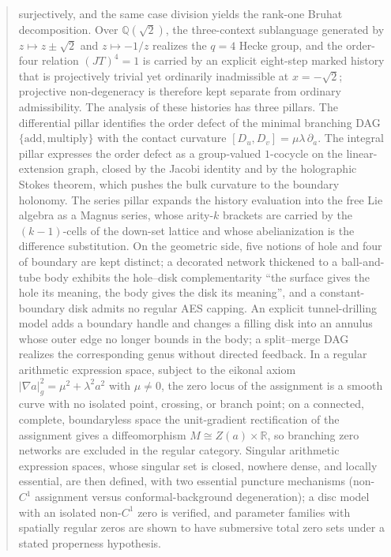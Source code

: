 \documentclass[11pt]{article}
\theoremstyle{definition}
\theoremstyle{remark}
\begin{document}
\begin{abstract}
surjectively, and the same case division yields the rank-one Bruhat
decomposition.  Over $\mathbb Q(\sqrt2)$, the three-context sublanguage generated
by $z\mapsto z\pm\sqrt2$ and $z\mapsto-1/z$ realizes the $q=4$ Hecke group, and
the order-four relation $(JT)^4=1$ is carried by an explicit eight-step marked
history that is projectively trivial yet ordinarily inadmissible at
$x=-\sqrt2$; projective non-degeneracy is therefore kept separate from ordinary
admissibility.
The analysis of these histories has three pillars.  The differential pillar
identifies the order defect of the minimal branching DAG $\{\mathrm{add},
\mathrm{multiply}\}$ with the contact curvature $[D_u,D_v]=\mu\lambda\,\partial_a$.
The integral pillar expresses the order defect as a group-valued $1$-cocycle on
the linear-extension graph, closed by the Jacobi identity and by the holographic
Stokes theorem, which pushes the bulk curvature to the boundary holonomy.  The
series pillar expands the history evaluation into the free Lie algebra as a
Magnus series, whose arity-$k$ brackets are carried by the $(k-1)$-cells of the
down-set lattice and whose abelianization is the difference substitution.
On the geometric side, five notions of hole and four of boundary are kept
distinct; a decorated network thickened to a ball-and-tube body exhibits the
hole--disk complementarity ``the surface gives the hole its meaning, the body
gives the disk its meaning'', and a constant-boundary disk admits no regular AES
capping.
An explicit tunnel-drilling model adds a boundary handle and changes a filling
disk into an annulus whose outer edge no longer bounds in the body; a split--merge
DAG realizes the corresponding genus without directed feedback.
In a regular arithmetic expression space, subject to the eikonal
axiom $|\nabla a|_g^2=\mu^2+\lambda^2a^2$ with $\mu\ne0$, the zero locus of the
assignment is a smooth curve with no isolated point, crossing, or branch point;
on a connected, complete, boundaryless space the unit-gradient rectification of
the assignment gives a diffeomorphism $M\cong Z(a)\times\mathbb R$, so branching
zero networks are excluded in the regular category.  Singular arithmetic
expression spaces, whose singular set is closed, nowhere dense, and locally
essential, are then defined, with two essential puncture mechanisms
(non-$C^1$ assignment versus conformal-background degeneration); a disc model
with an isolated non-$C^1$ zero is verified, and parameter families with
spatially regular zeros are shown to have submersive total zero sets under a
stated properness hypothesis.
\end{abstract}
\end{document}
